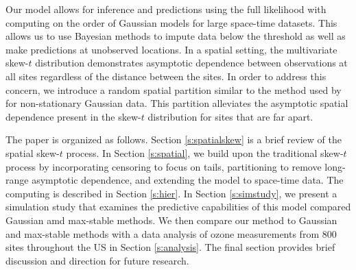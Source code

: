 \documentclass[11pt]{article}
\begin{document}
Our model allows for inference and predictions using the full likelihood with computing on the order of Gaussian models for large space-time datasets.
This allows us to use Bayesian methods to impute data below the threshold as well as make predictions at unobserved locations.
In a spatial setting, the multivariate skew-$t$ distribution demonstrates asymptotic dependence between observations at all sites regardless of the distance between the sites.
In order to address this concern, we introduce a random spatial partition similar to the method used by \citet{Kim2005} for non-stationary Gaussian data.
This partition alleviates the asymptotic spatial dependence present in the skew-$t$ distribution for sites that are far apart.

The paper is organized as follows.
Section \ref{s:spatialskew} is a brief review of the spatial skew-$t$ process.
In Section \ref{s:spatial}, we build upon the traditional skew-$t$ process by incorporating censoring to focus on tails, partitioning to remove long-range asymptotic dependence, and extending the model to space-time data.
The computing is described in Section \ref{s:hier}.
In Section \ref{s:simstudy}, we present a simulation study that examines the predictive capabilities of this model compared Gaussian amd max-stable methods.
We then compare our method to Gaussian and max-stable methods with a data analysis of ozone measurements from 800 sites throughout the US in Section \ref{s:analysis}.
The final section provides brief discussion and direction for future research.


\end{document}
